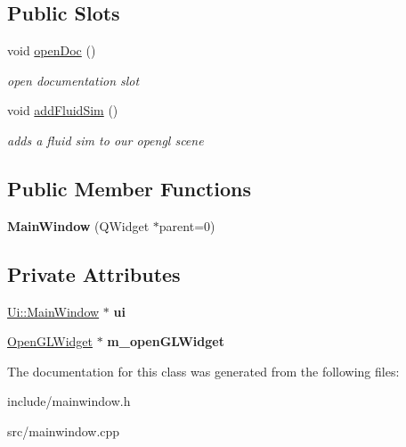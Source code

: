 \subsection*{Public Slots}
\begin{DoxyCompactItemize}
\item 
\hypertarget{class_main_window_a452fc3db76653e3355cd9eb81bc4f0cf}{void \hyperlink{class_main_window_a452fc3db76653e3355cd9eb81bc4f0cf}{open\-Doc} ()}\label{class_main_window_a452fc3db76653e3355cd9eb81bc4f0cf}

\begin{DoxyCompactList}\small\item\em open documentation slot \end{DoxyCompactList}\item 
\hypertarget{class_main_window_ab411c296f30fa6a6f7dffe17826dd85f}{void \hyperlink{class_main_window_ab411c296f30fa6a6f7dffe17826dd85f}{add\-Fluid\-Sim} ()}\label{class_main_window_ab411c296f30fa6a6f7dffe17826dd85f}

\begin{DoxyCompactList}\small\item\em adds a fluid sim to our opengl scene \end{DoxyCompactList}\end{DoxyCompactItemize}
\subsection*{Public Member Functions}
\begin{DoxyCompactItemize}
\item 
\hypertarget{class_main_window_a8b244be8b7b7db1b08de2a2acb9409db}{{\bfseries Main\-Window} (Q\-Widget $\ast$parent=0)}\label{class_main_window_a8b244be8b7b7db1b08de2a2acb9409db}

\end{DoxyCompactItemize}
\subsection*{Private Attributes}
\begin{DoxyCompactItemize}
\item 
\hypertarget{class_main_window_a35466a70ed47252a0191168126a352a5}{\hyperlink{class_ui_1_1_main_window}{Ui\-::\-Main\-Window} $\ast$ {\bfseries ui}}\label{class_main_window_a35466a70ed47252a0191168126a352a5}

\item 
\hypertarget{class_main_window_af310504f60344259d8a43e495e90e54d}{\hyperlink{class_open_g_l_widget}{Open\-G\-L\-Widget} $\ast$ {\bfseries m\-\_\-open\-G\-L\-Widget}}\label{class_main_window_af310504f60344259d8a43e495e90e54d}

\end{DoxyCompactItemize}


The documentation for this class was generated from the following files\-:\begin{DoxyCompactItemize}
\item 
include/mainwindow.\-h\item 
src/mainwindow.\-cpp\end{DoxyCompactItemize}
